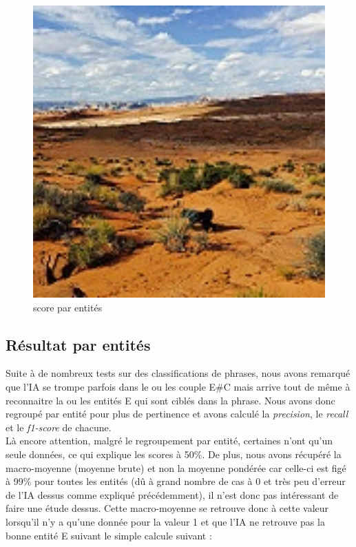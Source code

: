 \documentclass[12pt ,a4paper ]{article}
\begin{document}
\begin{multicols}{2}
\begin{figure}[t]
    \begin{center}
        \includegraphics[width=1.15\textwidth]{3808.jpg}
    \end{center}
    \caption{score par entités}
\end{figure}
\newpage
\subsection{Résultat par entités}
Suite à de nombreux tests sur des classifications de phrases, nous avons remarqué que l'IA se trompe parfois dans le ou les couple E\#C mais arrive tout de même à reconnaitre la ou les entités E qui sont ciblés dans la phrase. Nous avons donc regroupé par entité pour plus de pertinence et avons calculé la \textit{precision}, le \textit{recall} et le \textit{f1-score} de chacune.\\

Là encore attention, malgré le regroupement par entité, certaines n'ont qu'un seule données, ce qui explique les scores à 50\%. De plus, nous avons récupéré la macro-moyenne (moyenne brute) et non la moyenne pondérée car celle-ci est figé à 99\% pour toutes les entités (dû à grand nombre de cas à 0 et très peu d'erreur de l'IA dessus comme expliqué précédemment), il n'est donc pas intéressant de faire une étude dessus. Cette macro-moyenne se retrouve donc à cette valeur lorsqu'il n'y a qu'une donnée pour la valeur 1 et que l'IA ne retrouve pas la bonne entité E suivant le simple calcule suivant : 


\end{multicols}
\end{document}
